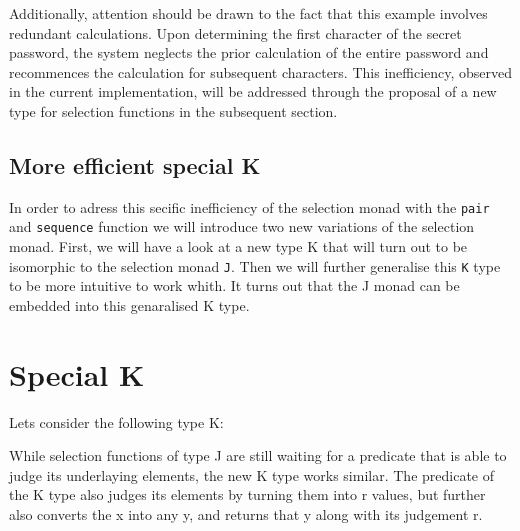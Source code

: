 \documentclass[runningheads]{llncs}
\begin{document}
Additionally, attention should be drawn to the fact that this example
involves redundant calculations. Upon determining the first character of
the secret password, the system neglects the prior calculation of the
entire password and recommences the calculation for subsequent
characters. This inefficiency, observed in the current implementation,
will be addressed through the proposal of a new type for selection
functions in the subsequent section.

\subsection{More efficient special K}\label{more-efficient-special-k}

In order to adress this secific inefficiency of the selection monad with
the \texttt{pair} and \texttt{sequence} function we will introduce two
new variations of the selection monad. First, we will have a look at a
new type K that will turn out to be isomorphic to the selection monad
\texttt{J}. Then we will further generalise this \texttt{K} type to be
more intuitive to work whith. It turns out that the J monad can be
embedded into this genaralised K type.

\section{Special K}\label{special-k}

Lets consider the following type K:

\begin{Shaded}
\begin{Highlighting}[]
 \OtherTok{=} \OtherTok{{-}\textgreater{}}\OtherTok{{-}\textgreater{}}
\end{Highlighting}
\end{Shaded}

While selection functions of type J are still waiting for a predicate
that is able to judge its underlaying elements, the new K type works
similar. The predicate of the K type also judges its elements by turning
them into r values, but further also converts the x into any y, and
returns that y along with its judgement r.

\begin{Shaded}
\begin{Highlighting}[]
 \OtherTok{{-}\textgreater{}} \OtherTok{{-}\textgreater{}} 
\OtherTok{=}\OtherTok{{-}\textgreater{}}\OtherTok{{-}\textgreater{}} \OtherTok{=}
\end{Highlighting}
\end{Shaded}
\end{document}
